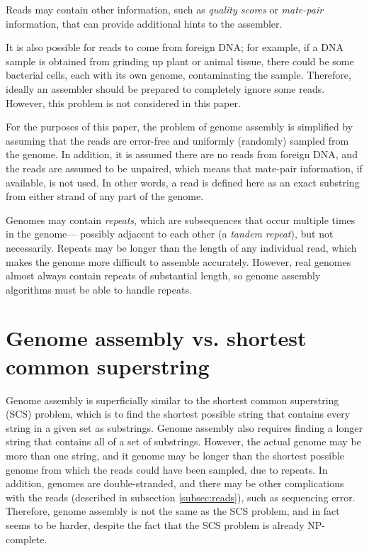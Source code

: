 \documentclass[10pt]{article}
\begin{document}
Reads may contain other information, such as {\it quality scores} or {\it
mate-pair} information, that can provide additional hints to the assembler.

It is also possible for reads to come from foreign DNA; for example, if a DNA
sample is obtained from grinding up plant or animal tissue, there could be some
bacterial cells, each with its own genome, contaminating the sample.  Therefore,
ideally an assembler should be prepared to completely ignore some reads.
However, this problem is not considered in this paper.

For the purposes of this paper, the problem of genome assembly is simplified by
assuming that the reads are error-free and uniformly (randomly) sampled from the
genome.  In addition, it is assumed there are no reads from foreign DNA, and the
reads are assumed to be unpaired, which means that mate-pair information, if
available, is not used.  In other words, a read is defined here as an exact
substring from either strand of any part of the genome.

Genomes may contain {\it repeats}, which are subsequences that occur multiple
times in the genome--- possibly adjacent to each other (a {\it tandem repeat}),
but not necessarily.  Repeats may be longer than the length of any individual
read, which makes the genome more difficult to assemble accurately.  However,
real genomes almost always contain repeats of substantial length, so genome
assembly algorithms must be able to handle repeats.

\section{Genome assembly vs. shortest common superstring}

Genome assembly is superficially similar to the shortest common superstring
(SCS) problem, which is to find the shortest possible string that contains every
string in a given set as substrings.  Genome assembly also requires finding a
longer string that contains all of a set of substrings.  However, the actual
genome may be more than one string, and it genome may be longer than the
shortest possible genome from which the reads could have been sampled, due to
repeats.  In addition,  genomes are double-stranded, and there may be other
complications with the reads (described in subsection \ref{subsec:reads}), such
as sequencing error.  Therefore, genome assembly is not the same as the SCS
problem, and in fact seems to be harder, despite the fact that the SCS problem
is already NP-complete\cite{Turner1989}.
\end{document}
